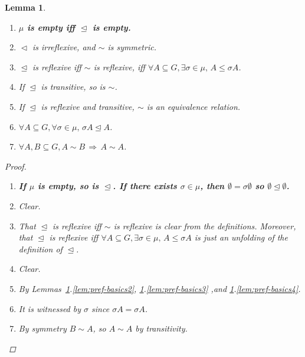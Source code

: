 \documentclass[11pt]{article}
\newcommand{\nouveau}[1]{{\small \color{blue} \bf  #1}}
\newtheorem{lemma}[definition]{Lemma}
\newcommand{\releq}{\mathrel{\trianglelefteq}}
\newcommand{\rel}{\mathrel{\triangleleft}}
\begin{document}
\begin{lemma}\label{lem:pref-basics}
\begin{enumerate}

\item\label{lem:pref-basics1} %
  \nouveau{ \(\mu\) is empty iff \(\releq\) is empty. }
 
 \item\label{lem:pref-basics2} $\rel$ is irreflexive, and $\sim$ is symmetric.

 \item\label{lem:pref-basics3} $\releq$ is reflexive iff $\sim$ is reflexive, iff $\forall A \subseteq G, \exists \sigma \in \mu,\, A \leq \sigma A$.
 
 \item\label{lem:pref-basics4} If $\releq$ is transitive, so is $\sim$.
 
 \item\label{lem:pref-basics5} If $\releq$ is reflexive and transitive, $\sim$ is an equivalence relation.
 
  \item\label{lem:pref-basics6} $\forall A \subseteq G, \forall \sigma \in \mu,\, \sigma A \releq A$.
  
    \item\label{lem:pref-basics7} $\forall A,B \subseteq G, A \sim B \,\Rightarrow\, A \sim A$.
\end{enumerate}

\begin{proof}
 \begin{enumerate}
 \item \nouveau{%
     If $\mu$ is empty, so is $\releq$.  If there exists
     \(\sigma \in \mu\), then \(\emptyset = \sigma \emptyset\) so
     \(\emptyset \unlhd \emptyset\). }
 
  \item Clear.
  
  \item That $\releq$ is reflexive iff $\sim$ is reflexive is clear from the definitions. Moreover, that $\releq$ is reflexive iff $\forall A \subseteq G, \exists \sigma \in \mu,\, A \leq \sigma A$ is just an unfolding of the definition of $\releq$.
  
  \item Clear.
  
  \item By Lemmas~\ref{lem:pref-basics}.\ref{lem:pref-basics2}, 
 \ref{lem:pref-basics}.\ref{lem:pref-basics3} ,and \ref{lem:pref-basics}.\ref{lem:pref-basics4}.
 
 \item It is witnessed by $\sigma$ since $\sigma A = \sigma A$.
 
 \item By symmetry $B \sim A$, so $A \sim A$ by transitivity.
 \end{enumerate}
\end{proof}
\end{lemma}
\end{document}
